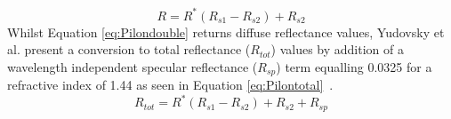 \begin{equation}
    R = R^*(R_{s1} - R_{s2}) + R_{s2}
\label{eq:Pilondouble}
\end{equation}
Whilst Equation \eqref{eq:Pilondouble} returns diffuse reflectance values, Yudovsky et al. present a conversion to total reflectance ($R_{tot}$) values by addition of a wavelength independent specular reflectance ($R_{sp}$) term equalling 0.0325 for a refractive index of 1.44 as seen in Equation \eqref{eq:Pilontotal}~\cite{Yudovsky2011a}.
\begin{equation}
    R_{tot} = R^*(R_{s1} - R_{s2}) + R_{s2} +R_{sp}
\label{eq:Pilontotal}
\end{equation}

